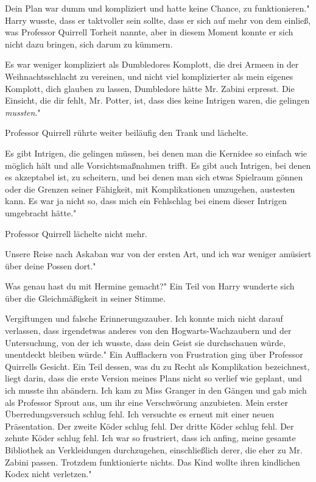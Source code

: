 \glqq Dein Plan war dumm und kompliziert und hatte keine Chance, zu
funktionieren." Harry wusste, dass er taktvoller sein sollte, dass er sich auf
mehr von dem einließ, was Professor Quirrell Torheit nannte, aber in diesem
Moment konnte er sich nicht dazu bringen, sich darum zu kümmern.

\glqq Es war weniger kompliziert als Dumbledores Komplott, die drei Armeen in
der Weihnachtsschlacht zu vereinen, und nicht viel komplizierter als mein
eigenes Komplott, dich glauben zu lassen, Dumbledore hätte Mr. Zabini erpresst.
Die Einsicht, die dir fehlt, Mr. Potter, ist, dass dies keine Intrigen waren,
die gelingen \emph{mussten}."

Professor Quirrell rührte weiter beiläufig den Trank und lächelte.

\glqq Es gibt Intrigen, die gelingen müssen, bei denen man die Kernidee so
einfach wie möglich hält und alle Vorsichtsmaßnahmen trifft. Es gibt auch
Intrigen, bei denen es akzeptabel ist, zu scheitern, und bei denen man sich
etwas Spielraum gönnen oder die Grenzen seiner Fähigkeit, mit Komplikationen
umzugehen, austesten kann. Es war ja nicht so, dass mich ein Fehlschlag bei
einem dieser Intrigen umgebracht hätte."

Professor Quirrell lächelte nicht mehr.

\glqq Unsere Reise nach Askaban war von der ersten Art, und ich war weniger
amüsiert über deine Possen dort."

\glqq Was genau hast du mit Hermine gemacht?" Ein Teil von Harry wunderte sich
über die Gleichmäßigkeit in seiner Stimme.

\glqq Vergiftungen und falsche Erinnerungszauber. Ich konnte mich nicht darauf
verlassen, dass irgendetwas anderes von den Hogwarts-Wachzaubern und der
Untersuchung, von der ich wusste, dass dein Geist sie durchschauen würde,
unentdeckt bleiben würde." Ein Aufflackern von Frustration ging über Professor
Quirrells Gesicht. \glqq Ein Teil dessen, was du zu Recht als Komplikation
bezeichnest, liegt darin, dass die erste Version meines Plans nicht so verlief
wie geplant, und ich musste ihn abändern. Ich kam zu Miss Granger in den Gängen
und gab mich als Professor Sprout aus, um ihr eine Verschwörung anzubieten. Mein
erster Überredungsversuch schlug fehl. Ich versuchte es erneut mit einer neuen
Präsentation. Der zweite Köder schlug fehl. Der dritte Köder schlug fehl. Der
zehnte Köder schlug fehl. Ich war so frustriert, dass ich anfing, meine gesamte
Bibliothek an Verkleidungen durchzugehen, einschließlich derer, die eher zu Mr.
Zabini passen. Trotzdem funktionierte nichts. Das Kind wollte ihren kindlichen
Kodex nicht verletzen."

